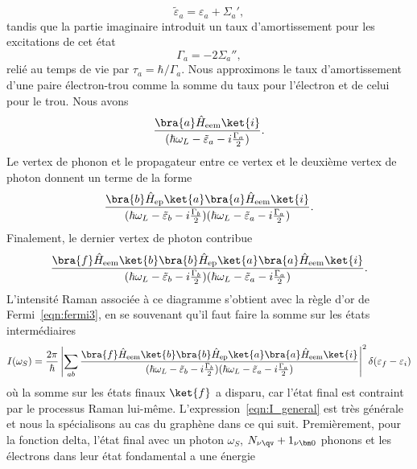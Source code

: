 \begin{equation}
    \tilde{\varepsilon}_a=\varepsilon_a +\Sigma_a',
\end{equation}
tandis que la partie imaginaire introduit un taux d'amortissement pour les excitations de cet état 
\begin{equation}
    \Gamma_a =-2\Sigma_a'',
\end{equation}
relié au temps de vie par $\tau_a = \hbar/\Gamma_a$. Nous approximons le taux d'amortissement d'une paire électron-trou comme la somme du taux pour l'électron et de celui pour le trou. Nous avons
\begin{equation}
    \frac{\bra{a}\hat{H}_\text{eem}\ket{i}}{(\hbar\omega_L-\tilde{\varepsilon}_a-i\frac{\Gamma_a}{2})}.
\end{equation}
Le vertex de phonon et le propagateur entre ce vertex et le deuxième vertex de photon donnent un terme de la forme
\begin{equation}
    \frac{\bra{b}\hat{H}_\text{ep}\ket{a}\bra{a}\hat{H}_\text{eem}\ket{i}}{(\hbar\omega_L-\tilde{\varepsilon}_b-i\frac{\Gamma_b}{2})(\hbar\omega_L -\tilde{\varepsilon}_a-i\frac{\Gamma_a}{2})}.
\end{equation}
Finalement, le dernier vertex de photon contribue
\begin{equation}
    \frac{\bra{f}\hat{H}_\text{eem}\ket{b}\bra{b}\hat{H}_\text{ep}\ket{a}\bra{a}\hat{H}_\text{eem}\ket{i}}{(\hbar\omega_L-\tilde{\varepsilon}_b-i\frac{\Gamma_b}{2})(\hbar\omega_L -\tilde{\varepsilon}_a-i\frac{\Gamma_a}{2})}.
\end{equation}
L'intensité Raman associée à ce diagramme s'obtient avec la règle d'or de Fermi~\eqref{eqn:fermi3}, en se souvenant qu'il faut faire la somme sur les états intermédiaires
\begin{equation}
    I(\omega_S) = \frac{2\pi}{\hbar}\left|\sum_{ab}\frac{\bra{f}\hat{H}_\text{eem}\ket{b}\bra{b}\hat{H}_\text{ep}\ket{a}\bra{a}\hat{H}_\text{eem}\ket{i}}{(\hbar\omega_L-\tilde{\varepsilon}_b-i\frac{\Gamma_b}{2})(\hbar\omega_L -\tilde{\varepsilon}_a-i\frac{\Gamma_a}{2})}\right|^2\delta(\varepsilon_f-\varepsilon_i)\label{eqn:I_general}
\end{equation}
où la somme sur les états finaux $\ket{f}$ a disparu, car l'état final est contraint par le processus Raman lui-même. L'expression~\eqref{eqn:I_general} est très générale et nous la spécialisons au cas du graphène dans ce qui suit. Premièrement, pour la fonction delta, l'état final avec un photon $\omega_S$, $N_{\nu\qv}+1_{\nu\bm 0}$ phonons et les électrons dans leur état fondamental a une énergie
